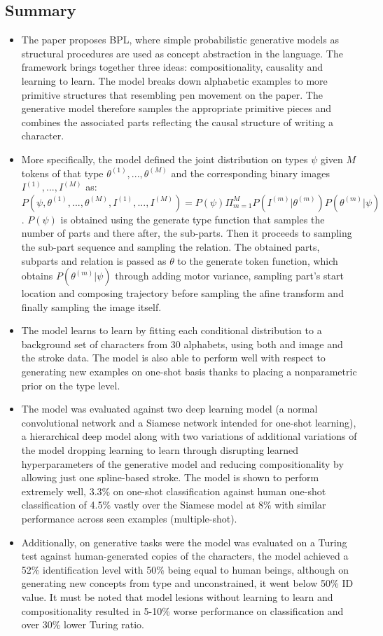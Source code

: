 \documentclass{article}
\begin{document}
\subsection{Summary}
\begin{itemize}
    \item The paper proposes BPL, where simple probabilistic generative models as structural procedures are used as concept abstraction in the language. The framework brings together three ideas: compositionality, causality and learning to learn. The model breaks down alphabetic examples to more primitive structures that resembling pen movement on the paper. The generative model therefore samples the appropriate primitive pieces and combines the associated parts reflecting the causal structure of writing a character.
    \item More specifically, the model defined the joint distribution on types $\psi$ given $M$ tokens of that type $\theta^(1), ..., \theta^(M)$ and the corresponding binary images $I^(1), ..., I^(M)$ as: $P(\psi, \theta^(1), ..., \theta^(M), I^(1), ..., I^(M)) = P(\psi) \Pi_{m=1}^M P(I^(m)|\theta^(m)) P(\theta^(m)|\psi)$. $P(\psi)$ is obtained using the generate type function that samples the number of parts and there after, the sub-parts. Then it proceeds to sampling the sub-part sequence and sampling the relation. The obtained parts, subparts and relation is passed as $\theta$ to the generate token function, which obtains $P(\theta^(m)|\psi)$ through adding motor variance, sampling part's start location and composing trajectory before sampling the afine transform and finally sampling the image itself.
    \item The model learns to learn by fitting each conditional distribution to a background set of characters from 30  alphabets, using both and image and the stroke data. The model is also able to perform well with respect to generating new examples on one-shot basis thanks to placing a nonparametric prior on the type level.
    \item The model was evaluated against two deep learning model (a normal convolutional network and a Siamese network intended for one-shot learning), a hierarchical deep model along with two variations of additional variations of the model dropping learning to learn through disrupting learned hyperparameters of the generative model and reducing compositionality by allowing just one spline-based stroke. The model is shown to perform extremely well, 3.3\% on one-shot classification against human one-shot classification of 4.5\% vastly over the Siamese model at 8\% with similar performance across seen examples (multiple-shot). 
    \item Additionally, on generative tasks were the model was evaluated on a Turing test against human-generated copies of the characters, the model achieved a 52\% identification level with 50\% being equal to human beings, although on generating new concepts from type and unconstrained, it went below 50\% ID value. It must be noted that model lesions without learning to learn and compositionality resulted in 5-10\% worse performance on classification and over 30\% lower Turing ratio.
\end{itemize}
\end{document}
